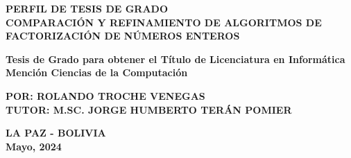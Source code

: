\begin{titlepage}
\begin{center}
		{\fontsize{16}{20}\selectfont \textbf{PERFIL DE TESIS DE GRADO}}\\
		
        {\fontsize{16}{18}\selectfont \textbf{COMPARACIÓN Y REFINAMIENTO DE ALGORITMOS DE FACTORIZACIÓN DE NÚMEROS ENTEROS}}
		
		{\fontsize{12}{12}\selectfont\textbf{Tesis de Grado para obtener el Título de Licenciatura en Informática Mención Ciencias de la Computación}}
		
		{\fontsize{16}{16}\selectfont\textbf{POR: ROLANDO TROCHE VENEGAS}}\\
    	{\fontsize{14}{14}\selectfont\textbf{TUTOR: M.SC. JORGE HUMBERTO TERÁN POMIER}}
		 
		\textbf{LA PAZ - BOLIVIA\\
		Mayo, 2024}
	\end{center}
\end{titlepage}
